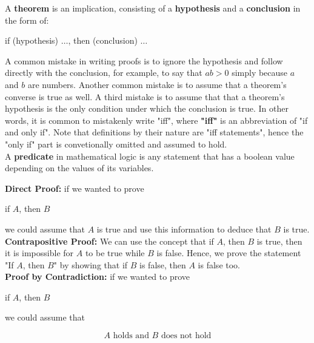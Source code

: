     \noindent A \textbf{theorem} is an implication, consisting of a \textbf{hypothesis} and a \textbf{conclusion} in the form of:

    \begin{center}
        if (hypothesis) $\dots$, then (conclusion) $\dots$
    \end{center}

    \noindent A common mistake in writing proofs is to ignore the hypothesis and follow directly with the conclusion, for example, to say that $ab>0$ simply because $a$ and $b$ are numbers. Another common mistake is
    to assume that a theorem's converse is true as well. A third mistake is to assume that that a theorem's hypothesis is the only condition under which the conclusion is true. In other words, it is common to
    mistakenly write "iff", where \textbf{"iff"} is an abbreviation of "if and only if". Note that definitions by their nature are "iff statements", hence the "only if" part is convetionally omitted and assumed to
    hold. \\

    \noindent A \textbf{predicate} in mathematical logic is any statement that has a boolean value depending on the values of its variables.

    \pagebreak

    \noindent \textbf{Direct Proof:} if we wanted to prove

    \begin{center}
        if $A$, then $B$
    \end{center}

    \noindent we could assume that $A$ is true and use this information to deduce that $B$ is true. \\

    \noindent \textbf{Contrapositive Proof:} We can use the concept that if $A$, then $B$ is true, then it is impossible for $A$ to be true while $B$ is false. Hence, we prove the statement "If $A$, then $B$" by showing
    that if $B$ is false, then $A$ is false too. \\

    \noindent \textbf{Proof by Contradiction:} if we wanted to prove

    \begin{center}
        if $A$, then $B$
    \end{center}

    \noindent we could assume that

    \begin{equation}
        A \text{ holds and } B \text{ does not hold}
    \end{equation}

